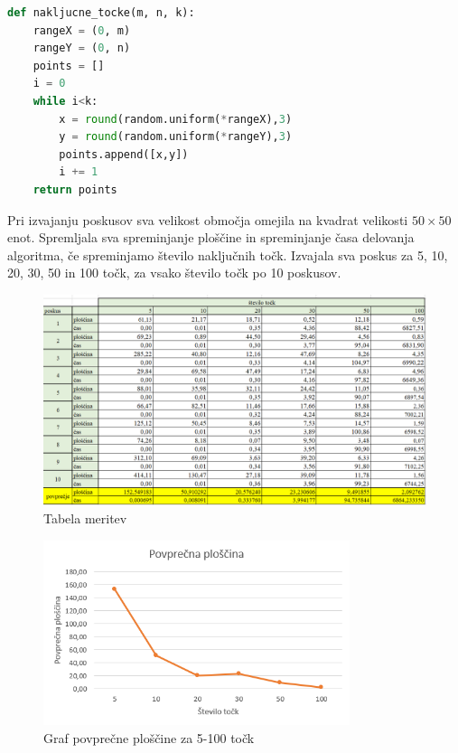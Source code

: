 \documentclass[a4, 12pt]{article}
\begin{document}
\newpage

\begin{lstlisting}[language=Python]
def nakljucne_tocke(m, n, k):
    rangeX = (0, m)
    rangeY = (0, n) 
    points = []
    i = 0
    while i<k:
        x = round(random.uniform(*rangeX),3)
        y = round(random.uniform(*rangeY),3)
        points.append([x,y])
        i += 1
    return points
\end{lstlisting} 

Pri izvajanju poskusov sva velikost območja omejila na kvadrat velikosti $50\times50$ enot. Spremljala sva spreminjanje ploščine in spreminjanje časa delovanja algoritma, če spreminjamo število naključnih točk. Izvajala sva poskus za 5, 10, 20, 30, 50 in 100 točk, za vsako število točk po 10 poskusov.

\begin{figure}[H]
  \centering
  \newpage
  \includegraphics[width= \textwidth]{tabela}
  \caption{Tabela meritev}
\end{figure}

\begin{figure}[H]
  \centering
  \newpage
  \includegraphics[width= 0.8\textwidth]{ploscina2}
  \caption{Graf povprečne ploščine za 5-100 točk}
\end{figure}
\end{document}
